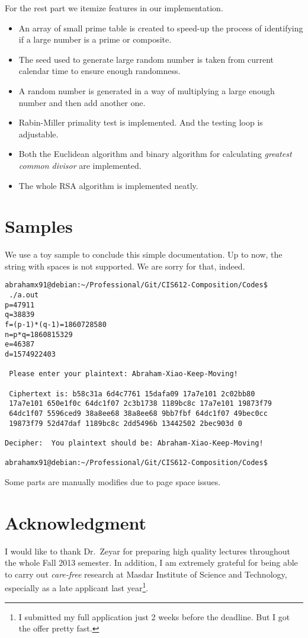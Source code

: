 \documentclass[12pt]{article}
\begin{document}
For the rest part we itemize features in our implementation.
\begin{itemize}
\item An array of small prime table is created to speed-up the process
  of identifying if a large number is a prime or composite.
\item The seed used to generate large random number is taken from
  current calendar time to ensure enough randomness. 
\item A random number is generated in a way of multiplying a large
  enough number and then add another one.
\item Rabin-Miller primality test is implemented. And the testing loop
  is adjustable.
\item Both the Euclidean algorithm and binary algorithm for
  calculating \emph{greatest common divisor} are implemented.
\item The whole RSA algorithm is implemented neatly.
\end{itemize}


\section{Samples}
\label{sec:samples}

We use a toy sample to conclude this simple documentation. Up to now,
the string with spaces is not supported. We are sorry for that,
indeed.
\begin{verbatim}
abrahamx91@debian:~/Professional/Git/CIS612-Composition/Codes$
 ./a.out 
p=47911
q=38839
f=(p-1)*(q-1)=1860728580
n=p*q=1860815329
e=46387
d=1574922403

 Please enter your plaintext: Abraham-Xiao-Keep-Moving!

 Ciphertext is: b58c31a 6d4c7761 15dafa09 17a7e101 2c02bb80 
 17a7e101 650e1f0c 64dc1f07 2c3b1738 1189bc8c 17a7e101 19873f79 
 64dc1f07 5596ced9 38a8ee68 38a8ee68 9bb7fbf 64dc1f07 49bec0cc 
 19873f79 52d47daf 1189bc8c 2dd5496b 13442502 2bec903d 0 

Decipher:  You plaintext should be: Abraham-Xiao-Keep-Moving!

abrahamx91@debian:~/Professional/Git/CIS612-Composition/Codes$ 

\end{verbatim}
Some parts are manually modifies due to page space issues.

\section*{Acknowledgment}
\label{sec:acknowledgment}
I would like to thank Dr.\ Zeyar for preparing high quality lectures
throughout the whole Fall 2013 semester. In addition, I am extremely
grateful for being able to carry out \emph{care-free} research at
Masdar Institute of Science and Technology, especially as a late
applicant last year\footnote{I submitted my full application just 2 weeks
before the deadline. But I got the offer pretty fast.}.





\end{document}

